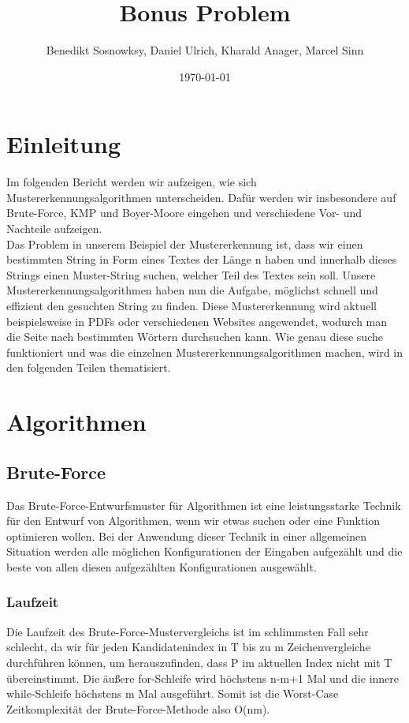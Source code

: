 \documentclass[14pt]{article}
\title{Bonus Problem}
\author{Benedikt Sosnowksy, Daniel Ulrich, Kharald Anager, Marcel Sinn}
\date{\today}
\begin{document}
\maketitle


\section{Einleitung}
Im folgenden Bericht werden wir aufzeigen, wie sich Mustererkennungsalgorithmen unterscheiden. Dafür werden wir insbesondere auf Brute-Force, KMP und Boyer-Moore eingehen und verschiedene Vor- und Nachteile aufzeigen.\\

Das Problem in unserem Beispiel der Mustererkennung ist, dass wir einen bestimmten String in Form eines Textes der Länge n haben und innerhalb dieses Strings einen Muster-String suchen, welcher Teil des Textes sein soll. Unsere Mustererkennungsalgorithmen haben nun die Aufgabe, möglichst schnell und effizient den gesuchten String zu finden. Diese Mustererkennung wird aktuell beispielsweise in PDFs oder verschiedenen Websites angewendet, wodurch man die Seite nach bestimmten Wörtern durchsuchen kann. Wie genau diese suche funktioniert und was die einzelnen Mustererkennungsalgorithmen machen, wird in den folgenden Teilen thematisiert.

\section{Algorithmen}
\subsection{Brute-Force}

Das Brute-Force-Entwurfsmuster für Algorithmen ist eine leistungsstarke Technik für den Entwurf von Algorithmen, wenn wir etwas suchen oder eine Funktion optimieren wollen. Bei der Anwendung dieser Technik in einer allgemeinen Situation werden alle möglichen Konfigurationen der Eingaben aufgezählt und die beste von allen diesen aufgezählten Konfigurationen ausgewählt.

\subsubsection{Laufzeit}
Die Laufzeit des Brute-Force-Mustervergleichs ist im schlimmsten Fall sehr schlecht, da wir für jeden Kandidatenindex in T bis zu m Zeichenvergleiche durchführen können, um herauszufinden, dass P im aktuellen Index nicht mit T übereinstimmt. Die äußere for-Schleife wird höchstens n-m+1 Mal und die innere while-Schleife höchstens m Mal ausgeführt. Somit ist die Worst-Case Zeitkomplexität der Brute-Force-Methode also O(nm).
\end{document}
